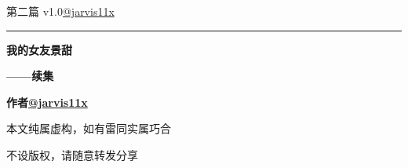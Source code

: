 \documentclass[10pt,twoside,openany]{book}
\begin{document}
\begin{titlepage}
\thispagestyle{empty}
\vspace*{0.52in}
{\sffamily\fontsize{8}{10}\selectfont 第二篇 v1.0\hfill \href{https://x.com/jarvis11x}{@jarvis11x}\par}
\vspace*{0.22in}
{\color{red}\rule{0.68in}{1.5pt}\par}
\vspace*{0.72in}
{\sffamily\bfseries\fontsize{29}{35}\selectfont 我的女友景甜\par}
{\sffamily\bfseries\fontsize{26}{32}\selectfont ——续集\par}
\vfill
{\sffamily\bfseries\fontsize{10}{14}\selectfont 作者\quad \href{https://x.com/jarvis11x}{@jarvis11x}\par}
\vspace*{0.18in}
{\rmfamily\fontsize{8.5}{12}\selectfont\color{SecondaryInk}本文纯属虚构，如有雷同实属巧合\par}
\vspace*{0.08in}
{\sffamily\fontsize{8.5}{12}\selectfont\color{red}不设版权，请随意转发分享\par}
\end{titlepage}
\setcounter{page}{1}
\pagestyle{bodyrunning}
\thispagestyle{bodyopening}
\vspace*{35pt}


\end{document}
